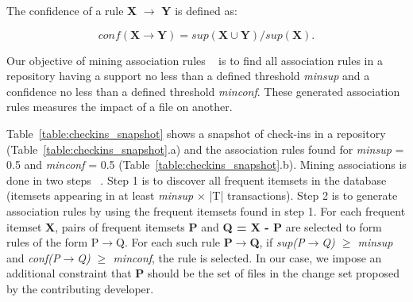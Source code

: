 The confidence of a rule \textbf{X} $\rightarrow$ \textbf{Y} is defined as:

\begin{equation}
conf(\textbf{X} \rightarrow \textbf{Y}) = \textit{sup}(\textbf{X}\cup\textbf{Y}) / \textit{sup}(\textbf{X}). 
\end{equation}

Our objective of mining association rules ~\cite{Agrawal} is to find all association rules in a repository having a support no less than a defined threshold \textit{minsup} and a confidence no less
than a defined threshold \textit{minconf}. These generated association rules measures the impact of a file on another.

Table~\ref{table:checkins_snapshot} shows a snapshot of check-ins in a repository (Table~\ref{table:checkins_snapshot}.a) and the association rules found for \textit{minsup} = 0.5 and \textit{minconf} = 0.5 (Table~\ref{table:checkins_snapshot}.b). Mining associations is done in two steps ~\cite{Agrawal}. Step 1 is to discover all frequent itemsets in the database (itemsets appearing in at least \textit{minsup} $\times$ |T| transactions). Step 2 is to generate association rules by using the frequent itemsets found in step 1. For each frequent itemset \textbf{X}, pairs of frequent itemsets \textbf{P} and \textbf{Q = X - P} are selected to form rules of the form P$\rightarrow$Q. For each such rule \textbf{P$\rightarrow$Q}, if \textit{sup(P$\rightarrow$Q) $\ge$ minsup} and \textit{conf(P$\rightarrow$Q) $\ge$ minconf}, the rule is selected. In our case, we impose an additional constraint that \textbf{P} should be the set of files in the change set proposed by the contributing developer.

